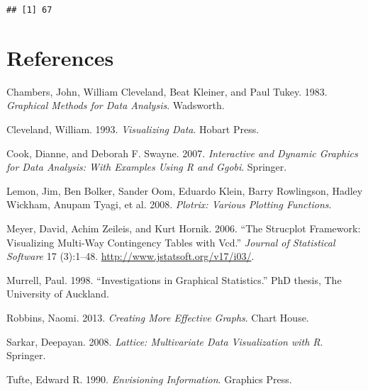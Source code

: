 \begin{Shaded}
\begin{Highlighting}[]
\NormalTok{(}\NormalTok{)}
\end{Highlighting}
\end{Shaded}

\begin{verbatim}
## [1] 67
\end{verbatim}

\hypertarget{references}{%
\section*{References}\label{references}}

\hypertarget{refs}{}
\leavevmode\hypertarget{ref-chambers:1983}{}%
Chambers, John, William Cleveland, Beat Kleiner, and Paul Tukey. 1983.
\emph{Graphical Methods for Data Analysis}. Wadsworth.

\leavevmode\hypertarget{ref-cleveland:1993}{}%
Cleveland, William. 1993. \emph{Visualizing Data}. Hobart Press.

\leavevmode\hypertarget{ref-cook:2007}{}%
Cook, Dianne, and Deborah F. Swayne. 2007. \emph{Interactive and Dynamic
Graphics for Data Analysis: With Examples Using R and Ggobi}. Springer.

\leavevmode\hypertarget{ref-plotrix}{}%
Lemon, Jim, Ben Bolker, Sander Oom, Eduardo Klein, Barry Rowlingson,
Hadley Wickham, Anupam Tyagi, et al. 2008. \emph{Plotrix: Various
Plotting Functions}.

\leavevmode\hypertarget{ref-meyer:2006}{}%
Meyer, David, Achim Zeileis, and Kurt Hornik. 2006. ``The Strucplot
Framework: Visualizing Multi-Way Contingency Tables with Vcd.''
\emph{Journal of Statistical Software} 17 (3):1--48.
\url{http://www.jstatsoft.org/v17/i03/}.

\leavevmode\hypertarget{ref-murrell:1998}{}%
Murrell, Paul. 1998. ``Investigations in Graphical Statistics.''
PhD thesis, The University of Auckland.

\leavevmode\hypertarget{ref-robbins:2004}{}%
Robbins, Naomi. 2013. \emph{Creating More Effective Graphs}. Chart
House.

\leavevmode\hypertarget{ref-sarkar:2008}{}%
Sarkar, Deepayan. 2008. \emph{Lattice: Multivariate Data Visualization
with R}. Springer.

\leavevmode\hypertarget{ref-tufte:1990}{}%
Tufte, Edward R. 1990. \emph{Envisioning Information}. Graphics Press.

